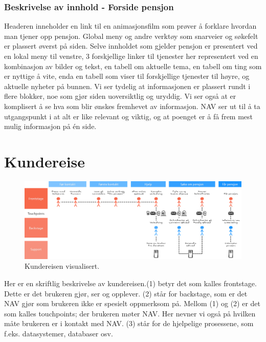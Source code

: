 \documentclass[informationsecurity]{gucmasterproject}
\begin{document}
\subsubsection{Beskrivelse av innhold - Forside pensjon}
Headeren inneholder en link til en animasjonsfilm som prøver å forklare hvordan man tjener opp pensjon. Global meny og andre verktøy som snarveier og søkefelt er plassert øverst på siden. Selve innholdet som gjelder pensjon er presentert ved en lokal meny til venstre, 3 forskjellige linker til tjenester her representert ved en kombinasjon av bilder og tekst, en tabell om aktuelle tema, en tabell om ting som er nyttige å vite, enda en tabell som viser til forskjellige tjenester til høyre, og aktuelle nyheter på bunnen.
Vi ser tydelig at informasjonen er plassert rundt i flere blokker, noe som gjør siden uoversiktlig og uryddig. Vi ser også at er komplisert å se hva som blir ønskes fremhevet av informasjon. NAV ser ut til å ta utgangspunkt i at alt er like relevant og viktig, og at poenget er å få frem mest mulig informasjon på én side.



\section{Kundereise}

\begin{figure}[h!]
	\centering
	\includegraphics[width=59em, angle=270]{kundereise}
	\caption{Kundereisen visualisert.}
	\label{fig:kundereise}
\end{figure}

Her er en skriftlig beskrivelse av kundereisen.(1) betyr det som kalles frontstage. Dette er det brukeren gjør, ser og opplever. (2) står for backstage, som er det NAV gjør som brukeren ikke er spesielt oppmerksom på. Mellom (1) og (2) er det som kalles touchpoints; der brukeren møter NAV. Her nevner vi også på hvilken måte brukeren er i kontakt med NAV. (3) står for de hjelpelige prosessene, som f.eks. datasystemer, databaser osv.
\end{document}
